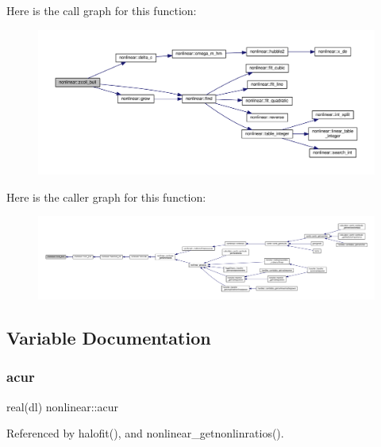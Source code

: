 Here is the call graph for this function\+:
\nopagebreak
\begin{figure}[H]
\begin{center}
\leavevmode
\includegraphics[width=350pt]{namespacenonlinear_a53b6da6e807b30b0078e77b9900c33b6_cgraph}
\end{center}
\end{figure}
Here is the caller graph for this function\+:
\nopagebreak
\begin{figure}[H]
\begin{center}
\leavevmode
\includegraphics[width=350pt]{namespacenonlinear_a53b6da6e807b30b0078e77b9900c33b6_icgraph}
\end{center}
\end{figure}


\subsection{Variable Documentation}
\mbox{\label{namespacenonlinear_a340583ce0b342fc665e8dac4abd41d30}} 
\subsubsection{\texorpdfstring{acur}{acur}}
{\footnotesize\ttfamily real(dl) nonlinear\+::acur\hspace{0.3cm}{\ttfamily [private]}}



Referenced by halofit(), and nonlinear\+\_\+getnonlinratios().

